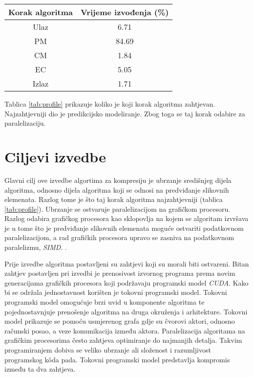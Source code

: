 \documentclass[times, utf8, zavrsni, numeric, sort]{fer}
\begin{document}
\begin{center}
 \label{tab:profile}
\begin{tabular}{| c | c |}
\hline
Korak algoritma & Vrijeme izvođenja (\%)
\\
\hline
Ulaz & 6.71
\\
\hline
PM & 84.69
\\
\hline
CM & 1.84
\\
\hline
EC & 5.05
\\
\hline
Izlaz & 1.71
\\
\hline
\end{tabular}
\end{center}

Tablica \ref{tab:profile} prikazuje koliko je koji korak algoritma zahtjevan. Najzahtjevniji dio je predikcijsko modeliranje. Zbog toga se taj korak odabire za paralelizaciju.

\section{Ciljevi izvedbe}
Glavni cilj ove izvedbe algortima za kompresiju je ubrzanje središnjeg dijela algoritma, odnosno dijela algoritma koji se odnosi na predviđanje slikovnih elemenata. Razlog tome je što taj korak algoritma najzahtjevniji (tablica \ref{tab:profile}). Ubrzanje se ostvaruje paralelizacijom na grafičkom procesoru. Razlog odabira grafičkog procesora kao sklopovlja na kojem se algoritam izvršava je u tome što je predviđanje slikovnih elemenata moguće ostvariti podatkovnom paralelizacijom, a rad grafičkih procesora upravo se zasniva na podatkovnom paralelizmu, \emph{SIMD}. .

Prije izvedbe algoritma postavljeni su zahtjevi koji su morali biti ostvareni. Bitan zahtjev postavljen pri izvedbi je prenosivost izvornog programa prema novim generacijama grafičkih procesora koji podržavaju programski model \emph{CUDA}. Kako bi se održala jednostavnost korišten je tokovni programski model. Tokovni programski model omogućuje brzi uvid u komponente algoritma te pojednostavnjuje prenošenje algoritma na druga okruženja i arhitekture. Tokovni model prikazuje se pomoću usmjerenog grafa gdje su čvorovi aktori, odnosno računski posao, a veze komunikacija između aktora.
Paralelizacija algoritama na grafičkim procesorima često zahtjeva optimiranje do najmanjih detalja. Takvim programiranjem dobiva se veliko ubrzanje ali složenost i razumljivost programskog k\^{o}da pada. Tokovni programski model predstavlja kompromis između ta dva zahtjeva.
\end{document}
